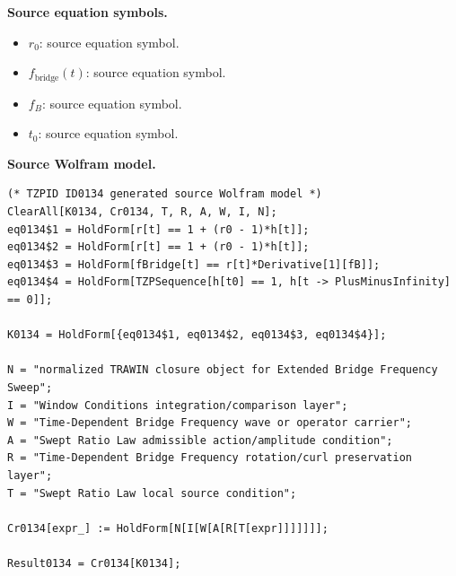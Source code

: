\begin{minipage}[t]{0.49\linewidth}
\begingroup
\small
\raggedright
\textbf{Source equation symbols.}\par
\begin{itemize}[leftmargin=1.35em,itemsep=1pt,topsep=1pt,parsep=0pt]
    \item $r_0$: source equation symbol.
    \item $f_{\mathrm{bridge}}(t)$: source equation symbol.
    \item $f_B$: source equation symbol.
    \item $t_0$: source equation symbol.
\end{itemize}
\endgroup
\end{minipage}\hfill
\begin{minipage}[t]{0.47\linewidth}
\begingroup
\scriptsize
\raggedright
\textbf{Source Wolfram model.}\par
\begin{Verbatim}[fontsize=\tiny,breaklines=true,breakanywhere=true]
(* TZPID ID0134 generated source Wolfram model *)
ClearAll[K0134, Cr0134, T, R, A, W, I, N];
eq0134$1 = HoldForm[r[t] == 1 + (r0 - 1)*h[t]];
eq0134$2 = HoldForm[r[t] == 1 + (r0 - 1)*h[t]];
eq0134$3 = HoldForm[fBridge[t] == r[t]*Derivative[1][fB]];
eq0134$4 = HoldForm[TZPSequence[h[t0] == 1, h[t -> PlusMinusInfinity] == 0]];

K0134 = HoldForm[{eq0134$1, eq0134$2, eq0134$3, eq0134$4}];

N = "normalized TRAWIN closure object for Extended Bridge Frequency Sweep";
I = "Window Conditions integration/comparison layer";
W = "Time-Dependent Bridge Frequency wave or operator carrier";
A = "Swept Ratio Law admissible action/amplitude condition";
R = "Time-Dependent Bridge Frequency rotation/curl preservation layer";
T = "Swept Ratio Law local source condition";

Cr0134[expr_] := HoldForm[N[I[W[A[R[T[expr]]]]]]];

Result0134 = Cr0134[K0134];
\end{Verbatim}
\endgroup
\end{minipage}

